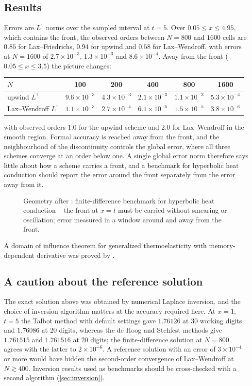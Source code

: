 \subsection{Results}
Errors are $L^1$ norms over the sampled interval at $t=5$. Over $0.05\le x\le4.95$, which contains the front, the observed orders between $N=800$ and $1600$ cells are $0.85$ for Lax--Friedrichs, $0.94$ for upwind and $0.58$ for Lax--Wendroff, with errors at $N=1600$ of $2.7\times10^{-3}$, $1.3\times10^{-3}$ and $8.6\times10^{-4}$. Away from the front ($0.05\le x\le3.5$) the picture changes:
\begin{center}
\begin{tabular}{@{}lccccc@{}}\toprule
$N$ & 100 & 200 & 400 & 800 & 1600\\\midrule
upwind $L^1$ & $9.6\times10^{-3}$ & $4.3\times10^{-3}$ & $2.1\times10^{-3}$ & $1.1\times10^{-3}$ & $5.3\times10^{-4}$\\
Lax--Wendroff $L^1$ & $1.1\times10^{-3}$ & $2.7\times10^{-4}$ & $6.1\times10^{-5}$ & $1.5\times10^{-5}$ & $3.8\times10^{-6}$\\
\bottomrule\end{tabular}
\end{center}
with observed orders $1.0$ for the upwind scheme and $2.0$ for Lax--Wendroff in the smooth region. Formal accuracy is reached away from the front, and the neighbourhood of the discontinuity controls the global error, where all three schemes converge at an order below one. A single global error norm therefore says little about how a scheme carries a front, and a benchmark for hyperbolic heat conduction should report the error around the front separately from the error away from it.

\begin{figure}[t!]\centering\small

\caption{Geometry after \citep{Joseph1990}: finite-difference benchmark for hyperbolic heat conduction -- the front at $x=t$ must be carried without smearing or oscillation; error measured in a window around and away from the front.}\label{fig:schemes-geo}
\end{figure}

A domain of influence theorem for generalized thermoelasticity with memory-dependent derivative was proved by \citep{Sarkar2019a}.

\subsection{A caution about the reference solution}
The exact solution above was obtained by numerical Laplace inversion, and the choice of inversion algorithm matters at the accuracy required here. At $x=1$, $t=5$ the Talbot method with default settings gave $1.76126$ at 30 working digits and $1.76086$ at 20 digits, whereas the de Hoog and Stehfest methods give $1.761515$ and $1.761516$ at 20 digits; the finite-difference solution at $N=800$ agrees with the latter to $2\times10^{-6}$. A reference solution with an error of $3\times10^{-4}$ or more would have hidden the second-order convergence of Lax--Wendroff at $N\gtrsim400$. Inversion results used as benchmarks should be cross-checked with a second algorithm (\cref{sec:inversion}).

